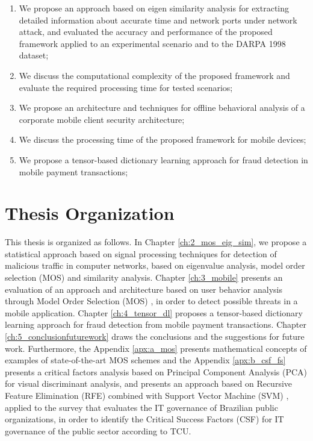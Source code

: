 \begin{enumerate}
	\item We propose an approach based on eigen similarity analysis for extracting detailed information about accurate time and network ports under network attack, and evaluated the accuracy and performance of the proposed framework applied to an experimental scenario and to the DARPA 1998 dataset;
	\item We discuss the computational complexity of the proposed framework and evaluate the required processing time for tested scenarios;
	\item We propose an architecture and techniques for offline behavioral analysis of a corporate mobile client security architecture;
	\item We discuss the processing time of the proposed framework for mobile devices;
	\item We propose a tensor-based dictionary learning approach for fraud detection in mobile payment transactions;
\end{enumerate}

\section{Thesis Organization}
\label{sc:organization}

This thesis is organized as follows. In Chapter \ref{ch:2_mos_eig_sim}, we propose a statistical approach based on signal processing techniques for detection of malicious traffic in computer networks, based on eigenvalue analysis, model order selection (MOS) and similarity analysis. Chapter \ref{ch:3_mobile} presents an evaluation of an approach and architecture based on user behavior analysis through Model Order Selection (MOS) \cite{tenorio2013greatest}, in order to detect possible threats in a mobile application. Chapter \ref{ch:4_tensor_dl} proposes a tensor-based dictionary learning approach for fraud detection from mobile payment transactions. Chapter \ref{ch:5_conclusionfuturework} draws the conclusions and the suggestions for future work. Furthermore, the Appendix \ref{apx:a_mos} presents mathematical concepts of examples of state-of-the-art MOS schemes and the Appendix \ref{apx:b_csf_fs} presents a critical factors analysis based on Principal Component Analysis (PCA) for visual discriminant analysis, and presents an approach based on Recursive Feature Elimination (RFE) combined with Support Vector Machine (SVM) \cite{hearst1998support}, applied to the survey that evaluates the IT governance of Brazilian public organizations, in order to identify the Critical Success Factors (CSF) for IT governance of the public sector according to TCU.